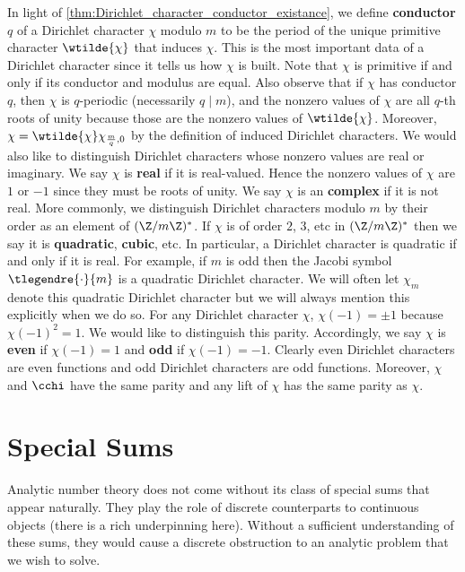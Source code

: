      In light of \cref{thm:Dirichlet_character_conductor_existance}, we define \textbf{conductor} $q$ of a Dirichlet character $\chi$ modulo $m$ to be the period of the unique primitive character $\wtilde{\chi}$ that induces $\chi$. This is the most important data of a Dirichlet character since it tells us how $\chi$ is built. Note that $\chi$ is primitive if and only if its conductor and modulus are equal. Also observe that if $\chi$ has conductor $q$, then $\chi$ is $q$-periodic (necessarily $q \mid m$), and the nonzero values of $\chi$ are all $q$-th roots of unity because those are the nonzero values of $\wtilde{\chi}$. Moreover, $\chi = \wtilde{\chi}\chi_{\frac{m}{q},0}$ by the definition of induced Dirichlet characters. We would also like to distinguish Dirichlet characters whose nonzero values are real or imaginary. We say $\chi$ is \textbf{real} if it is real-valued. Hence the nonzero values of $\chi$ are $1$ or $-1$ since they must be roots of unity. We say $\chi$ is an \textbf{complex} if it is not real. More commonly, we distinguish Dirichlet characters modulo $m$ by their order as an element of $(\Z/m\Z)^{\ast}$. If $\chi$ is of order $2$, $3$, etc in $(\Z/m\Z)^{\ast}$ then we say it is \textbf{quadratic}, \textbf{cubic}, etc. In particular, a Dirichlet character is quadratic if and only if it is real. For example, if $m$ is odd then the Jacobi symbol $\tlegendre{\cdot}{m}$ is a quadratic Dirichlet character. We will often let $\chi_{m}$ denote this quadratic Dirichlet character but we will always mention this explicitly when we do so. For any Dirichlet character $\chi$, $\chi(-1) = \pm 1$ because $\chi(-1)^{2} = 1$. We would like to distinguish this parity. Accordingly, we say $\chi$ is \textbf{even} if $\chi(-1) = 1$ and \textbf{odd} if $\chi(-1) = -1$. Clearly even Dirichlet characters are even functions and odd Dirichlet characters are odd functions. Moreover, $\chi$ and $\cchi$ have the same parity and any lift of $\chi$ has the same parity as $\chi$.
    \section{Special Sums}
      Analytic number theory does not come without its class of special sums that appear naturally. They play the role of discrete counterparts to continuous objects (there is a rich underpinning here). Without a sufficient understanding of these sums, they would cause a discrete obstruction to an analytic problem that we wish to solve.
